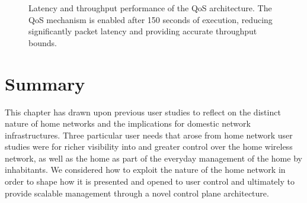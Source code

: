 \begin{figure} \centering
 \caption[QoS mechanism Latency and throughput evaluation]{\label{f:homework:performance-qos} Latency and throughput performance
  of the QoS architecture. The QoS mechanism is enabled after 150 seconds of
  execution, reducing significantly packet latency and providing accurate
  throughput bounds.}
\end{figure}

\section{Summary} \label{s:conclusion}

This chapter has drawn upon previous user studies to reflect on the distinct
nature of home networks and the implications for domestic network
infrastructures.  Three particular user needs that arose from home network user
studies were for richer visibility into and greater control over the home
wireless network, as well as the home as part of the everyday management of the
home by inhabitants.  We  considered how to exploit the nature of the home
network in order to shape how it is presented and opened to user control and
ultimately to provide scalable management through a novel control plane
architecture.  


